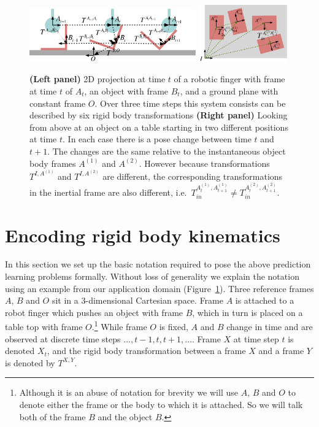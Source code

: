 \begin{figure}[t!]
\centerline{\includegraphics[width=0.64\textwidth]{sequential-frames}
\includegraphics[width=0.34\textwidth]{similarity}}
\caption[Setup1]{{\bf (Left panel)} 2D projection at time $t$ of a robotic finger with frame at time $t$ of $A_{t}$,
an object with frame $B_{t}$, and a ground plane with constant frame
$O$. Over three time steps this system consists can be described by six rigid body transformations %
{\bf (Right panel)} Looking from above at an object on a table starting in two different positions at time $t$. In each case there is a pose change between time $t$ and $t+1$. The changes are the same relative to the instantaneous object body frames $A^{(1)}$ and $A^{(2)}$. However because transformations $T^{I, A^{(1)}}$ and $T^{I, A^{(2)}}$ are different, the corresponding transformations in the inertial frame are also different, i.e.\ $T_{in}^{A^{(1)}_{t}, A^{(1)}_{t+1}} \neq T_{in}^{A^{(2)}_{t}, A^{(2)}_{t+1}}$.}
\label{fig:Learning.setup1}
\end{figure}

\section{Encoding rigid body kinematics}
\label{sec:Representations}

In this section we set up the basic notation required to pose the
above prediction learning problems formally. Without loss of generality we explain the notation using an example from our application domain
(Figure~\ref{fig:Learning.setup1}). Three reference frames $A$, $B$
and $O$ sit in a $3$\nobreakdash-\hspace{0pt}dimensional Cartesian
space. Frame $A$ is attached to a robot finger which pushes an object with frame $B$, which in turn is placed on a table top with frame
$O$.\footnote{Although it is an abuse of notation for brevity we will
  use $A$, $B$ and $O$ to denote either the frame or the body to which  it is attached. So we will talk both of the frame $B$ and the object $B$.} While frame $O$ is fixed, $A$ and $B$ change in time and are observed at discrete time steps $..., t-1, t, t+1, ...$.  Frame $X$ at
time step $t$ is denoted $X_t$, and the rigid body transformation
between a frame $X$ and a frame $Y$ is denoted by $T^{X, Y}$.

